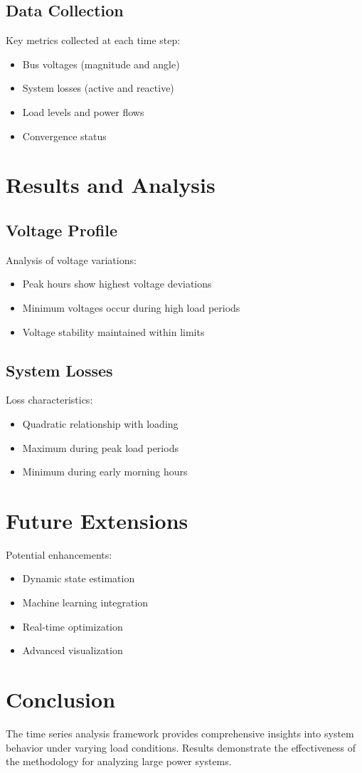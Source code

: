 \documentclass[11pt]{article}
\begin{document}
\subsection{Data Collection}
Key metrics collected at each time step:
\begin{itemize}
    \item Bus voltages (magnitude and angle)
    \item System losses (active and reactive)
    \item Load levels and power flows
    \item Convergence status
\end{itemize}

\section{Results and Analysis}

\subsection{Voltage Profile}
Analysis of voltage variations:
\begin{itemize}
    \item Peak hours show highest voltage deviations
    \item Minimum voltages occur during high load periods
    \item Voltage stability maintained within limits
\end{itemize}

\subsection{System Losses}
Loss characteristics:
\begin{itemize}
    \item Quadratic relationship with loading
    \item Maximum during peak load periods
    \item Minimum during early morning hours
\end{itemize}

\section{Future Extensions}
Potential enhancements:
\begin{itemize}
    \item Dynamic state estimation
    \item Machine learning integration
    \item Real-time optimization
    \item Advanced visualization
\end{itemize}

\section{Conclusion}
The time series analysis framework provides comprehensive insights into system behavior under varying load conditions. Results demonstrate the effectiveness of the methodology for analyzing large power systems.
\end{document}
